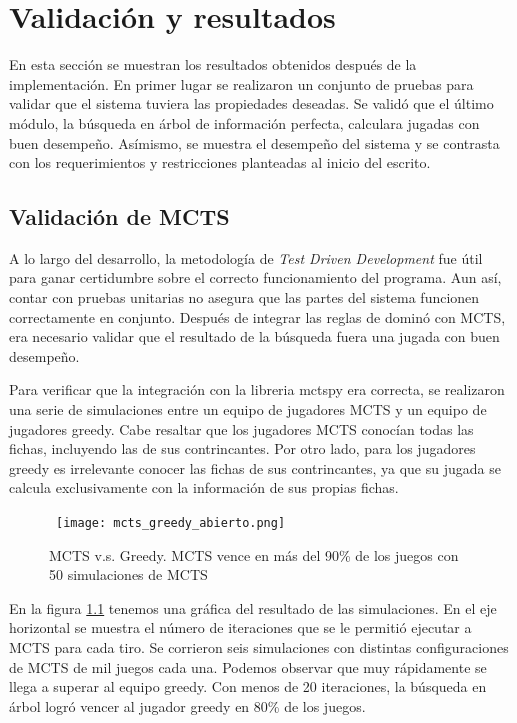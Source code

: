 \chapter{Validación y resultados}

\noindent
En esta sección se muestran los resultados obtenidos después de la implementación. En 
primer lugar se realizaron un conjunto de pruebas para validar que el sistema tuviera las 
propiedades deseadas. Se validó que el último módulo, la búsqueda en árbol de información 
perfecta, calculara jugadas con buen desempeño. Asímismo, se muestra el 
desempeño del sistema y se contrasta con los requerimientos y restricciones planteadas al 
inicio del escrito.

\section{Validación de MCTS}

A lo largo del desarrollo, la metodología de  \textit{Test Driven Development} fue útil para ganar 
certidumbre sobre el correcto funcionamiento del programa. Aun así, contar con pruebas 
unitarias no asegura que las partes del sistema funcionen correctamente en conjunto. 
Después de integrar las reglas de dominó con MCTS, era necesario validar que el resultado 
de la búsqueda fuera una jugada con buen desempeño. 

Para verificar que la integración con la libreria mctspy era correcta, se realizaron
una serie de simulaciones entre un equipo de jugadores MCTS y un equipo de jugadores greedy.
Cabe resaltar que los jugadores MCTS conocían todas las fichas, incluyendo
las de sus contrincantes. Por otro lado, para los jugadores greedy es irrelevante conocer las 
fichas de sus contrincantes, ya que su jugada se calcula exclusivamente con la información
de sus propias fichas.

\begin{figure}[ht]
\begin{center}
\hbox{\hspace{-1em} \texttt{[image: mcts\_greedy\_abierto.png]}}
\caption{MCTS v.s. Greedy. MCTS vence en más del 90\% de los juegos con 50 simulaciones de MCTS}
\label{MGA}
\end{center}
\end{figure}

En la figura \ref{MGA} tenemos una gráfica del resultado de las simulaciones. En el eje 
horizontal se muestra el número de iteraciones que se le permitió ejecutar a MCTS para 
cada tiro. Se corrieron seis simulaciones con distintas configuraciones de MCTS de mil 
juegos cada una. Podemos observar que muy rápidamente se llega a superar al equipo 
greedy. Con menos de 20 iteraciones, la búsqueda en árbol logró vencer al jugador greedy 
en 80\% de los juegos. 

